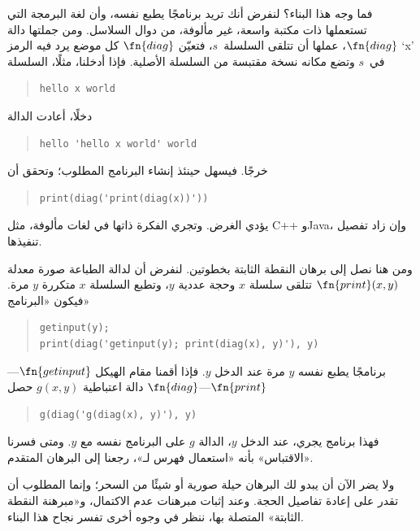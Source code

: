 \documentclass[../../../include/open-logic-section]{subfiles}
\begin{document}
\begin{explain}
فما وجه هذا البناء؟ لنفرض أنك تريد برنامجًا يطبع نفسه،
وأن لغة البرمجة التي تستعملها ذات مكتبة واسعة، غير مألوفة، من دوال
السلاسل. ومن جملتها دالة $\fn{diag}$، عملها
أن تتلقى السلسلة~$s$، فتعيّن $\fn{diag}$ كل موضع يرد فيه
الرمز `x' في~$s$ وتضع مكانه نسخة مقتبسة من السلسلة الأصلية. فإذا
أدخلنا، مثلًا، السلسلة
\begin{quote}
\begin{verbatim}
hello x world
\end{verbatim}
\end{quote}
دخلًا، أعادت الدالة
\begin{quote}
\begin{verbatim}
hello 'hello x world' world
\end{verbatim}
\end{quote}
خرجًا. فيسهل حينئذ إنشاء البرنامج المطلوب؛ وتحقق أن
\begin{quote}
\begin{verbatim}
print(diag('print(diag(x))'))
\end{verbatim}
\end{quote}
يؤدي الغرض. وتجري الفكرة ذاتها في لغات مألوفة، مثل C++ وJava،
وإن زاد تفصيل تنفيذها.

ومن هنا نصل إلى برهان النقطة الثابتة بخطوتين. لنفرض أن
لدالة الطباعة صورة معدلة $\fn{print}(x,y)$ تتلقى سلسلة $x$ وحجة
عددية $y$، وتطبع السلسلة $x$ متكررة $y$ مرة.
فيكون «البرنامج»
\begin{quote}
\begin{verbatim}
getinput(y);
print(diag('getinput(y); print(diag(x), y)'), y)
\end{verbatim}
\end{quote}
برنامجًا يطبع نفسه $y$ مرة عند الدخل $y$. فإذا أقمنا مقام الهيكل
$\fn{getinput}$---$\fn{print}$---$\fn{diag}$ دالة اعتباطية
$g(x,y)$ حصل
\begin{quote}
\begin{verbatim}
g(diag('g(diag(x), y)'), y)
\end{verbatim}
\end{quote}
فهذا برنامج يجري، عند الدخل $y$، الدالة $g$ على البرنامج نفسه مع
$y$. ومتى فسرنا «الاقتباس» بأنه «استعمال فهرس لـ»، رجعنا إلى
البرهان المتقدم.

ولا يضر الآن أن يبدو لك البرهان حيلة صورية أو شيئًا من
السحر؛ وإنما المطلوب أن تقدر على إعادة تفاصيل الحجة. وعند
إثبات مبرهنات عدم الاكتمال، و«مبرهنة النقطة الثابتة» المتصلة بها،
ننظر في وجوه أخرى تفسر نجاح هذا البناء.
\end{explain}
\end{document}

